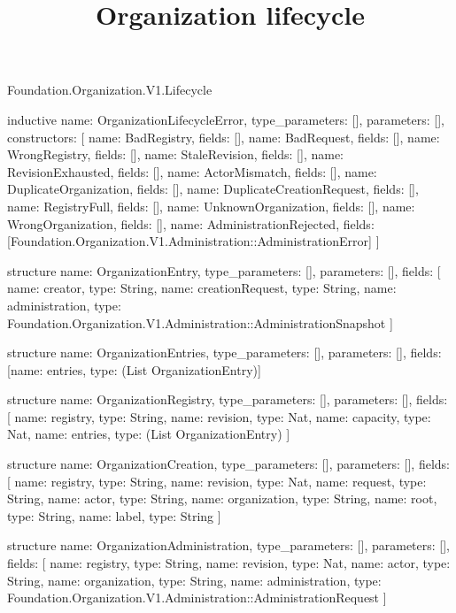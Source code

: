 \begin{lexlean}{Foundation.Organization.V1.Lifecycle}
\title{Organization lifecycle}
\begin{semanticmodule}
inductive{
  name: OrganizationLifecycleError,
  type_parameters: [],
  parameters: [],
  constructors: [
    {name: BadRegistry, fields: []},
    {name: BadRequest, fields: []},
    {name: WrongRegistry, fields: []},
    {name: StaleRevision, fields: []},
    {name: RevisionExhausted, fields: []},
    {name: ActorMismatch, fields: []},
    {name: DuplicateOrganization, fields: []},
    {name: DuplicateCreationRequest, fields: []},
    {name: RegistryFull, fields: []},
    {name: UnknownOrganization, fields: []},
    {name: WrongOrganization, fields: []},
    {
      name: AdministrationRejected,
      fields: [Foundation.Organization.V1.Administration::AdministrationError]
    }
  ]
}

structure{
  name: OrganizationEntry,
  type_parameters: [],
  parameters: [],
  fields: [
    {name: creator, type: String},
    {name: creationRequest, type: String},
    {name: administration, type: Foundation.Organization.V1.Administration::AdministrationSnapshot}
  ]
}

structure{
  name: OrganizationEntries,
  type_parameters: [],
  parameters: [],
  fields: [{name: entries, type: (List OrganizationEntry)}]
}

structure{
  name: OrganizationRegistry,
  type_parameters: [],
  parameters: [],
  fields: [
    {name: registry, type: String},
    {name: revision, type: Nat},
    {name: capacity, type: Nat},
    {name: entries, type: (List OrganizationEntry)}
  ]
}

structure{
  name: OrganizationCreation,
  type_parameters: [],
  parameters: [],
  fields: [
    {name: registry, type: String},
    {name: revision, type: Nat},
    {name: request, type: String},
    {name: actor, type: String},
    {name: organization, type: String},
    {name: root, type: String},
    {name: label, type: String}
  ]
}

structure{
  name: OrganizationAdministration,
  type_parameters: [],
  parameters: [],
  fields: [
    {name: registry, type: String},
    {name: revision, type: Nat},
    {name: actor, type: String},
    {name: organization, type: String},
    {name: administration, type: Foundation.Organization.V1.Administration::AdministrationRequest}
  ]
}


\end{semanticmodule}
\end{lexlean}
